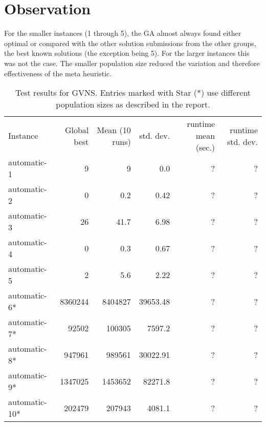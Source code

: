 \documentclass [11pt]{article}
\begin{document}
\section{Observation}
For the smaller instances (1 through 5), the GA almost always found either optimal or compared with the other solution submissions from the other groups, the best known solutions (the exception being 5). For the larger instances this was not the case. The smaller population size reduced the variation and therefore effectiveness of the meta heuristic. 

\newpage


\begin{sidewaystable}
  \centering
 \label{fig:results}
  \everyrow{\hline}
  \begin{tabu} {| l |r | r |r |r|r |}
  Instance        & Global best   & Mean (10 runs)   & std. dev. & runtime mean (sec.) & runtime std. dev.    \\ 
  automatic-1     & 9             & 9                   & 0.0           &  ? & ?       \\ 
  automatic-2     & 0             & 0.2                & 0.42          &  ? & ?       \\ 
  automatic-3     & 26            & 41.7                & 6.98          &  ? & ?        \\ 
  automatic-4     & 0             & 0.3                 & 0.67          &  ? & ?       \\ 
  automatic-5     & 2             & 5.6                & 2.22          &  ? & ?       \\ 
  automatic-6*     & 8360244       & 8404827           & 39653.48      &  ? & ?        \\ 
  automatic-7*     & 92502        & 100305            & 7597.2       &  ? & ?        \\ 
  automatic-8*     & 947961        & 989561              & 30022.91       &  ? & ?        \\ 
  automatic-9*     & 1347025        & 1453652              & 82271.8        &  ? & ?        \\ 
  automatic-10*    & 202479         & 207943               & 4081.1        &  ? & ?        \\ 
\end{tabu}
\caption{Test results for GVNS. Entries marked with Star (*) use different population sizes as described in the report.} 
\end{sidewaystable}
\end{document}
